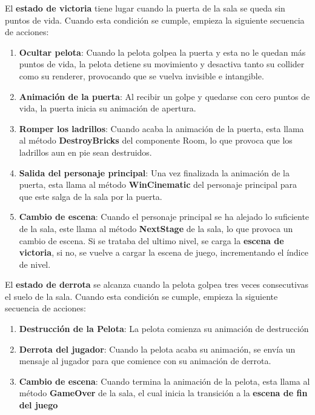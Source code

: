 El \textbf{estado de victoria} tiene lugar cuando la puerta de la sala se queda sin puntos de vida. Cuando esta condición se cumple, empieza la siguiente secuencia de acciones:
\begin{enumerate}
\item \textbf{Ocultar pelota}: Cuando la pelota golpea la puerta y esta no le quedan más puntos de vida, la pelota detiene su movimiento y desactiva tanto su collider como su renderer, provocando que se vuelva invisible e intangible.
\item \textbf{Animación de la puerta}: Al recibir un golpe y quedarse con cero puntos de vida, la puerta inicia su animación de apertura.
\item \textbf{Romper los ladrillos}: Cuando acaba la animación de la puerta, esta llama al método \textbf{DestroyBricks} del componente Room, lo que provoca que los ladrillos aun en pie sean destruidos.
\item \textbf{Salida del personaje principal}: Una vez finalizada la animación de la puerta, esta llama al método \textbf{WinCinematic} del personaje principal para que este salga de la sala por la puerta.
\item \textbf{Cambio de escena}: Cuando el personaje principal se ha alejado lo suficiente de la sala, este llama al método \textbf{NextStage} de la sala, lo que provoca un cambio de escena. Si se trataba del ultimo nivel, se carga la \textbf{escena de victoria}, si no, se vuelve a cargar la escena de juego, incrementando el índice de nivel.
\end{enumerate}

El \textbf{estado de derrota} se alcanza cuando la pelota golpea tres veces consecutivas el suelo de la sala. Cuando esta condición se cumple, empieza la siguiente secuencia de acciones:
\begin{enumerate}
\item \textbf{Destrucción de la Pelota}: La pelota comienza su animación de destrucción
\item \textbf{Derrota del jugador}: Cuando la pelota acaba su animación, se envía un mensaje al jugador para que comience con su animación de derrota.
\item \textbf{Cambio de escena}: Cuando termina la animación de la pelota, esta llama al método \textbf{GameOver} de la sala, el cual inicia la transición a la \textbf{escena de fin del juego}
\end{enumerate}

